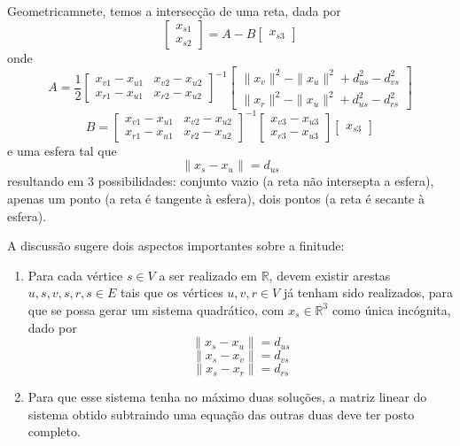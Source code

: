 \documentclass[a4paper,12pt]{article}
\begin{document}
	Geometricamnete, temos a intersecção de uma reta, dada por
	$$
	\begin{bmatrix}
	x_{s1}\\
	x_{s2}
	\end{bmatrix} =
	A -
	B
	\begin{bmatrix}
	x_{s3}
	\end{bmatrix}
	$$
	onde
	$$
	A = \frac{1}{2} \begin{bmatrix}
	x_{v1} - x_{u1} & x_{v2} - x_{u2}\\
	x_{r1} - x_{u1} & x_{r2} - x_{u2}
	\end{bmatrix}^{-1} 
	\begin{bmatrix}
	\|x_{v}\|^{2} - \|x_{u}\|^{2} + d_{us}^{2} - d_{vs}^{2}\\
	\|x_{r}\|^{2} - \|x_{u}\|^{2} + d_{us}^{2} - d_{rs}^{2}
	\end{bmatrix} 
	$$
	$$
	B = \begin{bmatrix}
	x_{v1} - x_{u1} & x_{v2} - x_{u2}\\
	x_{r1} - x_{u1} & x_{r2} - x_{u2}
	\end{bmatrix}^{-1}
	\begin{bmatrix}
	x_{v3} - x_{u3}\\
	x_{r3} - x_{u3}
	\end{bmatrix}
	\begin{bmatrix}
	x_{s3}
	\end{bmatrix}
	$$
	e uma esfera tal que
	$$
	\|x_{s} - x_{u}\|= d_{us}
	$$
	resultando em 3 possibilidades: conjunto vazio (a reta não intersepta a esfera), apenas um ponto (a reta é tangente à esfera), dois pontos (a reta é secante à esfera).
	
	A discussão sugere dois aspectos importantes sobre a finitude:
	
	\begin{enumerate}
		\item Para cada vértice $s\in V$ a ser realizado em $\mathbb{R}$, devem existir arestas ${u, s}, {v, s}, {r, s} \in E$ tais que os vértices $u, v, r \in V$ já tenham sido realizados, para que se possa gerar um sistema quadrático, com $x_{s} \in\mathbb{R}^{3}$ como única incógnita, dado por
		$$
		\|x_{s} - x_{u}\|= d_{us}
		$$
		$$
		\|x_{s} - x_{v}\|= d_{vs}
		$$
		$$
		\|x_{s} - x_{r}\|= d_{rs}
		$$
		\item Para que esse sistema tenha no máximo duas soluções, a matriz linear do sistema obtido subtraindo uma equação das outras duas deve ter posto completo.
	\end{enumerate}
	
\end{document}
